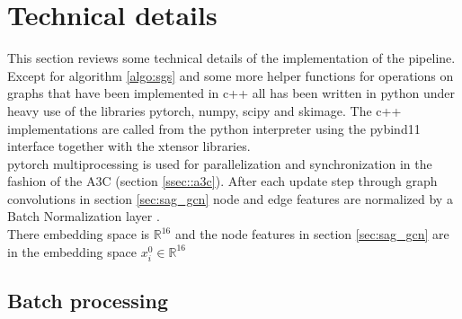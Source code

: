 \section{Technical details}\label{sec:tech}
This section reviews some technical details of the implementation of the pipeline. Except for algorithm \ref{algo:sgs} and some more helper functions for operations on graphs that have been implemented in c++ all has been written in python under heavy use of the libraries pytorch, numpy, scipy and skimage. The c++ implementations are called from the python interpreter using the pybind11 interface together with the xtensor libraries.\\
pytorch multiprocessing is used for parallelization and synchronization in the fashion of the A3C (section \ref{ssec::a3c}). After each update step through graph convolutions in section \ref{sec:sag_gcn} node and edge features are normalized by a Batch Normalization layer \cite{ioffe2015batch}.\\
There embedding space is $\mathbb{R}^{16}$ and the node features in section \ref{sec:sag_gcn} are in the embedding space $x_{i}^0 \in \mathbb{R}^{16}$


\subsection{Batch processing}\label{ssec:batchp}